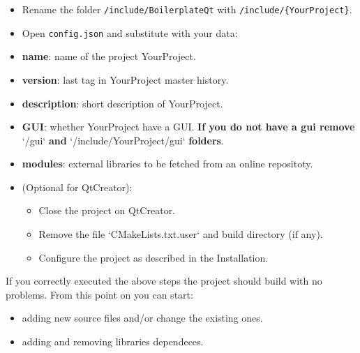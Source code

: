 \begin{itemize}
  \item
        Rename the folder \texttt{/include/BoilerplateQt} with
        \texttt{/include/\{YourProject\}}.
\end{itemize}

\begin{itemize}
  \item
        Open \texttt{config.json} and substitute with your data:
\end{itemize}

\begin{itemize}
  \item \textbf{name}: name of the project {YourProject}.

  \item \textbf{version}: last tag in {YourProject} master history.

  \item \textbf{description}: short description of {YourProject}.

  \item \textbf{GUI}: whether {YourProject} have a GUI. \textbf{If you do not have a gui remove} `/gui` \textbf{and} `/include/{YourProject}/gui` \textbf{folders}.

  \item \textbf{modules}: external libraries to be fetched from an online repositoty.
\end{itemize}

\begin{itemize}
  \item
        (Optional for QtCreator):
        \begin{itemize}
          \item Close the project on QtCreator.

          \item Remove the file `CMakeLists.txt.user` and build directory (if any).

          \item Configure the project as described in the Installation.
        \end{itemize}
\end{itemize}


If you correctly executed the above steps the project should build with
no problems. From this point on you can start:

\begin{itemize}
  \item
        adding new source files and/or change the existing ones.
\end{itemize}

\begin{itemize}
  \item
        adding and removing libraries dependeces.
\end{itemize}

